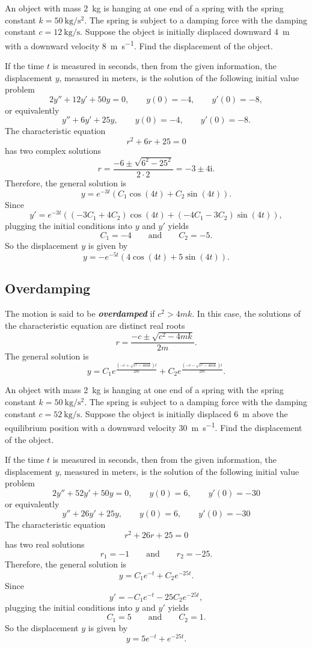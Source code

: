 \begin{example} 
	An object with mass \SI{2}{\kg} is hanging at one end of a spring with the spring constant $k=\SI{50}{\kg\per\square\second}$. The spring is subject to a damping force with the damping constant $c=\SI{12}{\kg\per\second}$. Suppose the object is initially displaced downward \SI{4}{\meter} with a downward velocity \SI{8}{\meter\per\second}. Find the displacement of the object.
\end{example}
\begin{solution}
If the time $t$ is measured in seconds, then from the given information, the displacement $y$, measured in meters, is the solution of the following initial value problem
\[2y''+ 12y'+50y=0, \qquad y(0)=-4,\qquad y'(0)=-8,\]
or equivalently
\[y''+6y'+25y, \qquad y(0)=-4,\qquad y'(0)=-8.\]
The characteristic equation
\[r^2+6r+25=0\]
has two complex solutions
\[r=\frac{-6\pm\sqrt{6^2-25^2}}{2\cdot 2}=-3\pm 4\mathrm{i}.\]
Therefore, the general solution is
\[y=e^{-3t}(C_1\cos(4t)+C_2\sin(4t)).\]
Since
\[y'=e^{-3t}((-3C_1+4C_2)\cos(4t)+(-4C_1-3C_2)\sin(4t)),\]
plugging the initial conditions into $y$ and $y'$ yields
\[C_1=-4\qquad\text{and}\qquad C_2=-5.\]
So the displacement $y$ is given by
\[y=-e^{-5t}(4\cos(4t)+5\sin(4t)).\]
\end{solution}

\subsection*{Overdamping} 

The motion is said to be \emph{\textbf{overdamped}} if $c^2>4mk$. In this case, the solutions of the characteristic equation are distinct real roots 
\[r=\frac{-c\pm\sqrt{c^2-4mk}}{2m}.\]
The general solution is
\[y=C_1e^{\frac{\left(-c+\sqrt{c^2-4mk}\right)t}{2m}}+C_2e^{\frac{\left(-c-\sqrt{c^2-4mk}\right)t}{2m}}.\]

\begin{example} 
  An object with mass \SI{2}{\kg} is hanging at one end of a spring with the spring constant $k=\SI{50}{\kg\per\square\second}$. The spring is subject to a damping force with the damping constant $c=\SI{52}{\kg\per\second}$. Suppose the object is initially displaced \SI{6}{\meter} above the equilibrium position with a downward velocity \SI{30}{\meter\per\second}. Find the displacement of the object.
\end{example}
\begin{solution}
  If the time $t$ is measured in seconds, then from the given information, the displacement $y$, measured in meters, is the solution of the following initial value problem
  \[2y''+ 52y'+50y=0, \qquad y(0)=6,\qquad y'(0)=-30\]
  or equivalently
  \[y''+ 26y'+25y, \qquad y(0)=6,\qquad y'(0)=-30\]
  The characteristic equation
  \[r^2+26r+25=0\]
  has two real solutions
  \[r_1=-1\qquad\text{and}\qquad r_2=-25.\]
  Therefore, the general solution is
  \[y=C_1e^{-t}+C_2e^{-25t}.\]
  Since
  \[y'=-C_1e^{-t}-25C_2e^{-25t},\]
  plugging the initial conditions into $y$ and $y'$ yields
  \[C_1=5\qquad\text{and}\qquad C_2=1.\]
  So the displacement $y$ is given by
  \[y=5e^{-t}+e^{-25t}.\]
  \end{solution}

